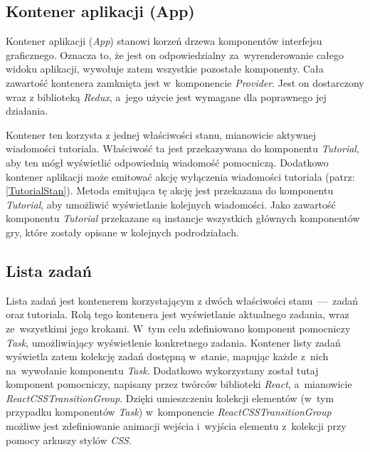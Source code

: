 \documentclass[12pt,a4paper,polish,thesis]{dcsbook}
\begin{document}
{	\subsection{Kontener aplikacji (App)}

	Kontener aplikacji (\textit{App}) stanowi korzeń drzewa komponentów interfejsu graficznego. Oznacza to, że jest on odpowiedzialny za~wyrenderowanie całego widoku aplikacji, wywołuje zatem wszystkie pozostałe komponenty. Cała zawartość kontenera zamknięta jest w~komponencie \textit{Provider}. Jest on dostarczony wraz z biblioteką \textit{Redux}, a~jego użycie jest wymagane dla poprawnego jej działania.

	Kontener ten korzysta z jednej właściwości stanu, mianowicie aktywnej wiadomości tutoriala. Właściwość ta jest przekazywana do komponentu \textit{Tutorial}, aby ten mógł wyświetlić odpowiednią wiadomość pomocniczą. Dodatkowo kontener aplikacji może emitować akcję wyłączenia wiadomości tutoriala (patrz: \ref{TutorialStan}). Metoda emitująca tę akcję jest przekazana do komponentu \textit{Tutorial}, aby umożliwić wyświetlanie kolejnych wiadomości. Jako zawartość komponentu \textit{Tutorial} przekazane są instancje wszystkich głównych komponentów gry, które zostały opisane w kolejnych podrodziałach.

	\subsection{Lista zadań}

	Lista zadań jest kontenerem korzystającym z dwóch właściwości stanu~---~zadań oraz tutoriala. Rolą tego kontenera jest wyświetlanie aktualnego zadania, wraz ze~wszystkimi jego krokami. W~tym celu zdefiniowano komponent pomocniczy \textit{Task}, umożliwiający wyświetlenie konkretnego zadania. Kontener listy zadań wyświetla zatem kolekcję zadań dostępną w~stanie, mapując każde z~nich na~wywołanie komponentu \textit{Task}. Dodatkowo wykorzystany został tutaj komponent pomocniczy, napisany przez twórców biblioteki \textit{React}, a~mianowicie \textit{ReactCSSTransitionGroup}. Dzięki umieszczeniu kolekcji elementów (w~tym przypadku komponentów \textit{Task}) w~komponencie \textit{ReactCSSTransitionGroup} możliwe jest zdefiniowanie animacji wejścia i~wyjścia elementu z~kolekcji przy pomocy arkuszy stylów \textit{CSS}.

}
\end{document}
